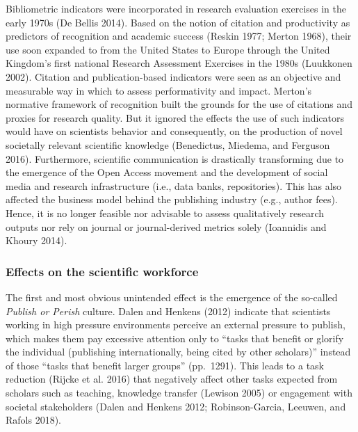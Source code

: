 \documentclass[]{elsarticle} %
\begin{document}
Bibliometric indicators were incorporated in research evaluation
exercises in the early 1970s (De Bellis 2014). Based on the notion of
citation and productivity as predictors of recognition and academic
success (Reskin 1977; Merton 1968), their use soon expanded to from the
United States to Europe through the United Kingdom's first national
Research Assessment Exercises in the 1980s (Luukkonen 2002). Citation
and publication-based indicators were seen as an objective and
measurable way in which to assess performativity and impact. Merton's
normative framework of recognition built the grounds for the use of
citations and proxies for research quality. But it ignored the effects
the use of such indicators would have on scientists behavior and
consequently, on the production of novel societally relevant scientific
knowledge (Benedictus, Miedema, and Ferguson 2016). Furthermore,
scientific communication is drastically transforming due to the
emergence of the Open Access movement and the development of social
media and research infrastructure (i.e., data banks, repositories). This
has also affected the business model behind the publishing industry
(e.g., author fees). Hence, it is no longer feasible nor advisable to
assess qualitatively research outputs nor rely on journal or
journal-derived metrics solely (Ioannidis and Khoury 2014).

\hypertarget{effects-on-the-scientific-workforce}{%
\subsubsection{Effects on the scientific
workforce}\label{effects-on-the-scientific-workforce}}

The first and most obvious unintended effect is the emergence of the
so-called \emph{Publish or Perish} culture. Dalen and Henkens (2012)
indicate that scientists working in high pressure environments perceive
an external pressure to publish, which makes them pay excessive
attention only to ``tasks that benefit or glorify the individual
(publishing internationally, being cited by other scholars)'' instead of
those ``tasks that benefit larger groups'' (pp.~1291). This leads to a
task reduction (Rijcke et al. 2016) that negatively affect other tasks
expected from scholars such as teaching, knowledge transfer (Lewison
2005) or engagement with societal stakeholders (Dalen and Henkens 2012;
Robinson-Garcia, Leeuwen, and Rafols 2018).
\end{document}
